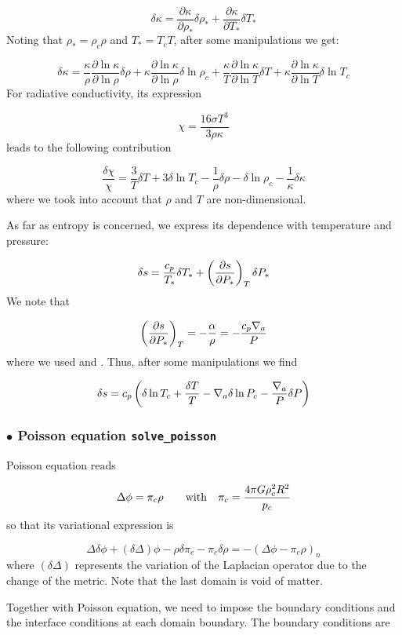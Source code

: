 \[ \delta\kappa = \frac{\partial\kappa}{\partial\rho_*}\delta\rho_* +
\frac{\partial\kappa}{\partial T_*}\delta T_*\]
Noting that $\rho_*=\rho_c\rho$ and $T_*=T_cT$, after some manipulations we
get:

\[ \delta\kappa =
\frac{\kappa}{\rho}\frac{\partial\ln\kappa}{\partial\ln\rho}\delta\rho +
\kappa\frac{\partial\ln\kappa}{\partial\ln\rho}\delta\ln\rho_c +
\frac{\kappa}{T}\frac{\partial\ln\kappa}{\partial\ln T}\delta T +
\kappa\frac{\partial\ln\kappa}{\partial\ln T}\delta\ln T_c\]
For radiative conductivity, its expression

\[ \chi = \frac{16\sigma T^3}{3\rho\kappa}\]
leads to the following contribution

\[ \frac{\delta \chi}{\chi} = \frac{3}{T}\delta T+3\delta\ln T_c
-\frac{1}{\rho}\delta\rho - \delta\ln\rho_c - \frac{1}{\kappa}\delta\kappa\]
where we took into account that $\rho$ and $T$ are non-dimensional.

As far as entropy is concerned, we express its dependence with temperature and
pressure:

\[ \delta s = \frac{c_p}{T_*}\delta T_* + \left(\frac{\partial s}{\partial
P_*}\right)_T\delta P_*\]
We note that

\[ \left(\frac{\partial s}{\partial
P_*}\right)_T = -\frac{\alpha}{\rho} = -\frac{c_p\nabla_a}{P}\]
where we used  and .
Thus, after some manipulations we find

\[ \delta s = c_p\left(\delta\ln T_c + \frac{\delta T}{T} - \nabla_a\delta\ln P_c
-\frac{\nabla_a}{P}\delta P \right)\]

\subsubsection{$\bullet$ \bf Poisson equation {\tt solve\_poisson}}

Poisson equation reads

\[ \Delta \phi = \pi_c \rho \qquad {\rm with}\quad  \pi_c = \frac{4 \pi G
\rho_c^2 R^2}{p_c}\]
so that its variational expression is 

\[ \Delta \delta\phi +(\delta\Delta)\phi - \rho\delta\pi_c  -
\pi_c\delta\rho = -(\Delta \phi - \pi_c \rho)_n \]
where $(\delta\Delta)$ represents the variation of the Laplacian operator due
to the change of the metric. Note that the last domain is void of matter.

Together with Poisson equation, we need to impose the boundary conditions and
the interface conditions at each domain boundary. The boundary conditions are

